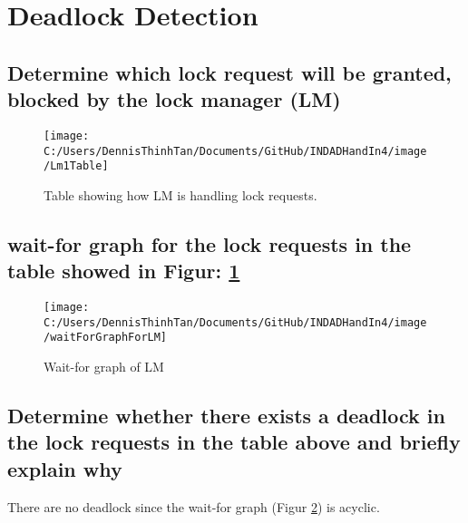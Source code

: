 \section{Deadlock Detection}
\subsection{Determine which lock request will be granted, blocked by the lock manager (LM)}

\begin{figure}
\centering
\texttt{[image: C:/Users/DennisThinhTan/Documents/GitHub/INDADHandIn4/image/Lm1Table]}
\caption[Table showing how LM is handling locks]{Table showing how LM is handling lock requests.}
\label{fig:LmTable}
\end{figure}

\subsection{wait-for graph for the lock requests in the table showed in Figur: \ref{fig:LmTable}}
	
\begin{figure}
\centering
\texttt{[image: C:/Users/DennisThinhTan/Documents/GitHub/INDADHandIn4/image/waitForGraphForLM]}
\caption[Wait-for graph of LM]{}
\caption{Wait-for graph of LM}
\label{fig:waitForGraphForLM}
\end{figure}

\pagebreak
\subsection{Determine whether there exists a deadlock in the lock requests in the table above and briefly explain why}
There are no deadlock since the wait-for graph (Figur \ref{fig:waitForGraphForLM}) is acyclic.

